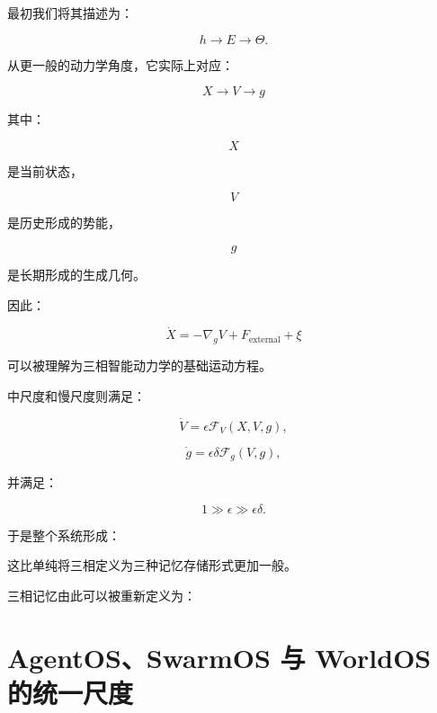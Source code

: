 最初我们将其描述为：

\[
h
\rightarrow
E
\rightarrow
\Theta.
\]

从更一般的动力学角度，它实际上对应：

\[
\boxed{
X
\rightarrow
V
\rightarrow
g
}
\]

其中：

\[
X
\]

是当前状态，

\[
V
\]

是历史形成的势能，

\[
g
\]

是长期形成的生成几何。

因此：

\[
\boxed{
\dot X
=
-\nabla_gV
+
F_{\mathrm{external}}
+
\xi
}
\]

可以被理解为三相智能动力学的基础运动方程。

中尺度和慢尺度则满足：

\[
\dot V
=
\epsilon
\mathcal{F}_V(X,V,g),
\]

\[
\dot g
=
\epsilon\delta
\mathcal{F}_g(V,g),
\]

并满足：

\[
1
\gg
\epsilon
\gg
\epsilon\delta.
\]

于是整个系统形成：

\begin{statementbox}
\centering
{}
\end{statementbox}

这比单纯将三相定义为三种记忆存储形式更加一般。

三相记忆由此可以被重新定义为：

\begin{statementbox}
\centering
{}
\end{statementbox}


\section{AgentOS、SwarmOS 与 WorldOS 的统一尺度}

